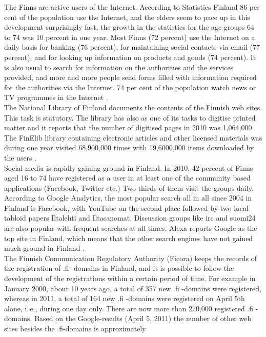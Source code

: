 \begin{multicols}{2}
The Finns are active users of the Internet. According to Statistics
Finland 86 per cent of the population use the Internet, and the elders
seem to pace up in this development surprisingly fast, the growth in
the statistics for the age groups 64 to 74 was 10 percent in one
year. Most Finns (72 percent) use the Internet on a daily basis for
banking (76 percent), for maintaining social contacts via email (77
percent), and for looking up information on products and goods (74
percent). It is also usual to search for information on the
authorities and the services provided, and more and more people send
forms filled with information required for the authorities via the
Internet. 74 per cent of the population watch news or TV programmes in
the Internet \cite{SVT}.\\
The National Library of Finland documents the contents of the Finnish web
sites. This task is statutory. The library has also as one of its tasks to
digitise printed matter and it reports that the number of digitised pages in
2010 was 1,064,000. The FinElib library containing electronic articles and
other licensed materials was during one year visited 68,900,000 times with
19,6000,000 items downloaded by the users \cite{natlibstat}.\\
Social media is rapidly gaining ground in Finland. In 2010, 42 percent
of Finns aged 16 to 74 have registered as a user in at least one of the
community based applications (Facebook, Twitter etc.) Two thirds of
them visit the groups daily. According to Google Analytics, the most
popular search all in all since 2004 in Finland is Facebook, with
YouTube on the second place followed by two local tabloid papers
Iltalehti and Iltasanomat. Discussion groups like irc and suomi24 are
also popular with frequent searches at all times. Alexa reports Google
as the top site in Finland, which means that the other search engines
have not gained much ground in Finland \cite{topsites}.\\
The Finnish Communication Regulatory Authority (Ficora) keeps the
records of the registration of .fi -domains in Finland, and it is
possible to follow the development of the registrations within a
certain period of time. For example in January 2000, about 10 years
ago, a total of 357 new .fi -domains were registered, whereas in 2011,
a total of 164 new .fi -domains were registered on April 5th alone,
i.\,e., during one day only. There are now more than 270,000 registered
.fi -domains. Based on the Google-results (April 5, 2011) the number
of other web sites besides the .fi-domains is approximately

\end{multicols}

